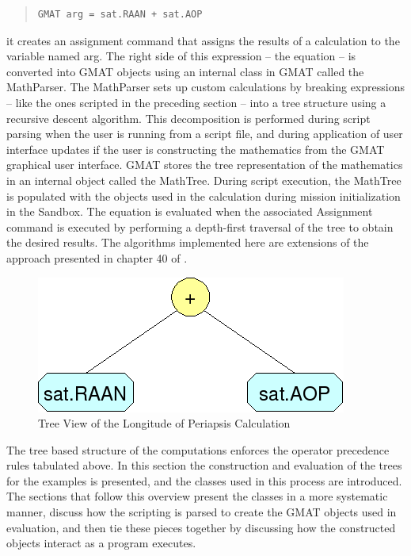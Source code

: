 \begin{quote}\begin{verbatim}
GMAT arg = sat.RAAN + sat.AOP
\end{verbatim}\end{quote}

\noindent it creates an assignment command that assigns the results of a calculation to the variable
named arg. The right side of this expression -- the equation -- is converted into GMAT objects using
an internal class in GMAT called the MathParser.  The MathParser sets up custom calculations by
breaking expressions -- like the ones scripted in the preceding section -- into a tree structure
using a recursive descent algorithm.  This decomposition is performed during script parsing when the
user is running from a script file, and during application of user interface updates if the user is
constructing the mathematics from the GMAT graphical user interface.  GMAT stores the tree
representation of the mathematics in an internal object called the MathTree.  During script
execution, the MathTree is populated with the objects used in the calculation during mission
initialization in the Sandbox.  The equation is evaluated when the associated Assignment command is
executed by performing a depth-first traversal of the tree to obtain the desired results.  The
algorithms implemented here are extensions of the approach presented in chapter 40 of
\cite{schildt}.

\begin{figure}[tb]
\begin{center}
\includegraphics[144,63]{Images/nodePlusAop.png}
\caption{\label{figure:longPeriapseTree}Tree View of the Longitude of Periapsis Calculation}
\end{center}
\end{figure}

The tree based structure of the computations enforces the operator precedence rules tabulated above.
 In this section the construction and evaluation of the trees for the examples is presented, and the
classes used in this process are introduced.  The sections that follow this overview present the
classes in a more systematic manner, discuss how the scripting is parsed to create the GMAT objects
used in evaluation, and then tie these pieces together by discussing how the constructed objects
interact as a program executes.


